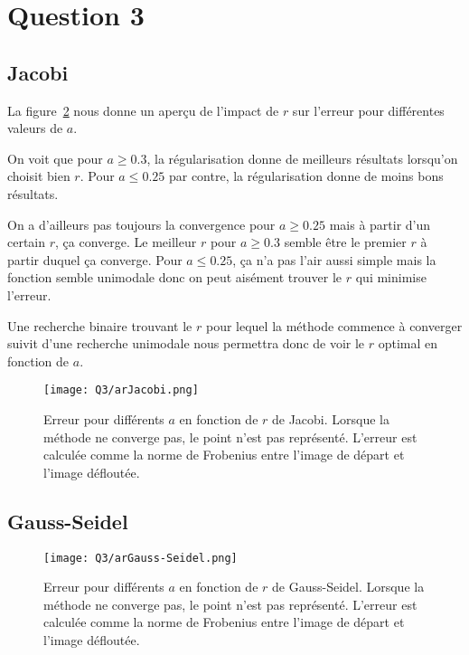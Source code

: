 \section{Question 3}

\subsection{Jacobi}
La figure~\ref{fig:ar} nous donne un aperçu de l'impact de $r$
sur l'erreur pour différentes valeurs de $a$.

On voit que pour $a \geq 0.3$, la régularisation donne de meilleurs résultats
lorsqu'on choisit bien $r$.
Pour $a \leq 0.25$ par contre, la régularisation donne de moins bons résultats.

On a d'ailleurs pas toujours la convergence pour $a \geq 0.25$ mais à partir
d'un certain $r$, ça converge.
Le meilleur $r$ pour $a \geq 0.3$ semble être le premier $r$ à partir duquel
ça converge.
Pour $a \leq 0.25$, ça n'a pas l'air aussi simple mais la fonction semble
unimodale donc on peut aisément trouver le $r$ qui minimise l'erreur.

Une recherche binaire trouvant le $r$ pour lequel la méthode commence à converger
suivit d'une recherche unimodale nous permettra donc de voir le $r$ optimal en
fonction de $a$.

\begin{figure}
  \centering
  \texttt{[image: Q3/arJacobi.png]}
  \caption{Erreur pour différents $a$ en fonction de $r$ de Jacobi.
  Lorsque la méthode ne converge pas, le point n'est pas représenté.
  L'erreur est calculée comme la norme de Frobenius entre l'image de départ
  et l'image défloutée.}
  \label{fig:ar}
\end{figure}

\subsection{Gauss-Seidel}

\begin{figure}
  \centering
  \texttt{[image: Q3/arGauss-Seidel.png]}
  \caption{Erreur pour différents $a$ en fonction de $r$ de Gauss-Seidel.
  Lorsque la méthode ne converge pas, le point n'est pas représenté.
  L'erreur est calculée comme la norme de Frobenius entre l'image de départ
  et l'image défloutée.}
  \label{fig:ar}
\end{figure}

